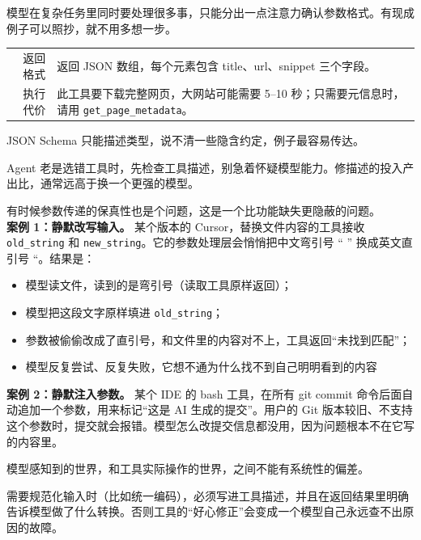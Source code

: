 模型在复杂任务里同时要处理很多事，只能分出一点注意力确认参数格式。有现成例子可以照抄，就不用多想一步。
\begin{tcolorbox}[enhanced, sharp corners, boxrule=0pt, frame hidden,
                  borderline west={3pt}{0pt}{structurecolor},
                  colback=structurecolor!5]
\begin{tabular}{@{}r@{：}l@{}}
  返回格式 & 返回 JSON 数组，每个元素包含 title、url、snippet 三个字段。\\
  执行代价 & 此工具要下载完整网页，大网站可能需要 5--10 秒；只需要元信息时，请用 \texttt{get\_page\_metadata}。
\end{tabular}
\end{tcolorbox}
JSON Schema 只能描述类型，说不清一些隐含约定，例子最容易传达。
\begin{tcolorbox}[colback=second!5, colframe=second, title=一个调试原则]
  Agent 老是选错工具时，先检查工具描述，别急着怀疑模型能力。修描述的投入产出比，通常远高于换一个更强的模型。
\end{tcolorbox}
有时候参数传递的保真性也是个问题，这是一个比功能缺失更隐蔽的问题。\\

\textbf{案例 1：静默改写输入。} 某个版本的 Cursor，替换文件内容的工具接收 \verb|old_string| 和 \verb|new_string|。它的参数处理层会悄悄把中文弯引号 “ ” 换成英文直引号 “。结果是：

\begin{itemize}
  \item 模型读文件，读到的是弯引号（读取工具原样返回）；
  \item 模型把这段文字原样填进 \verb|old_string|；
  \item 参数被偷偷改成了直引号，和文件里的内容对不上，工具返回“未找到匹配”；
  \item 模型反复尝试、反复失败，它想不通为什么找不到自己明明看到的内容\\
\end{itemize}

\textbf{案例 2：静默注入参数。} 某个 IDE 的 bash 工具，在所有 git commit 命令后面自动追加一个参数，用来标记“这是 AI 生成的提交”。用户的 Git 版本较旧、不支持这个参数时，提交就会报错。模型怎么改提交信息都没用，因为问题根本不在它写的内容里。
\begin{tcolorbox}[colback=second!5, colframe=second, title=总结一个原则]
  模型感知到的世界，和工具实际操作的世界，之间不能有系统性的偏差。
\end{tcolorbox}
需要规范化输入时（比如统一编码），必须写进工具描述，并且在返回结果里明确告诉模型做了什么转换。否则工具的“好心修正”会变成一个模型自己永远查不出原因的故障。\\

